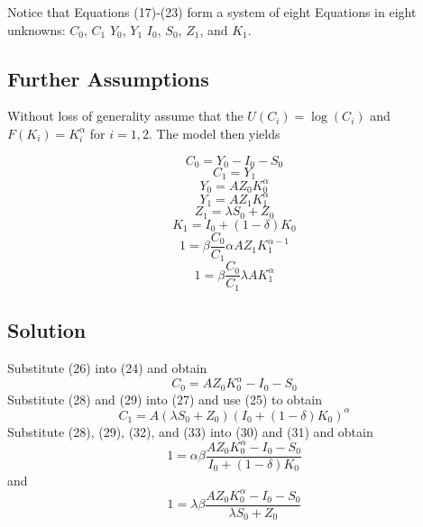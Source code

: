 \documentclass{article}
\begin{document}
	
	Notice that Equations (17)-(23) form a system of eight Equations in eight unknowns: $C_0$, $C_1$ $Y_0$, $Y_1$ $I_0$, $S_0$, $Z_{1}$, and $K_{1}$.
	
	\subsection*{Further Assumptions}
	
	Without loss of generality assume that the $U(C_i) = \log(C_i)$ and $F(K_i) = K_i^{\alpha}$ for $i = 1,2$. The model then yields
	
	\begin{equation}
	C_0 = Y_0 - I_0 - S_0
	\end{equation}
	\begin{equation}
	C_1 = Y_1
	\end{equation}
	\begin{equation}
	Y_0 = A Z_0 K_0^{\alpha}
	\end{equation}
	\begin{equation}
	Y_1 = A Z_1 K_1^{\alpha}
	\end{equation}
	\begin{equation}
	Z_{1} = \lambda S_0 + Z_0
	\end{equation}
	\begin{equation}
	K_{1} = I_0 + (1 - \delta)K_0
	\end{equation}
	\begin{equation}
	1 =  \beta \frac{C_{0}}{C_1}  \alpha A Z_{1} K_{1}^{\alpha - 1}
	\end{equation}
	\begin{equation}
	1 =  \beta  \frac{C_{0}}{C_1} \lambda  A K_{1}^{\alpha} 
	\end{equation}
	
	\subsection*{Solution}
	
	Substitute (26) into (24) and obtain
	\begin{equation}
	C_0 = A Z_0 K_0^{\alpha} - I_0 - S_0
	\end{equation}
	Substitute (28) and (29) into (27) and use (25) to obtain
	\begin{equation}
	C_1 = A (\lambda S_0 + Z_0) (I_0 + (1 - \delta)K_0)^{\alpha}
	\end{equation}
	Substitute (28), (29), (32), and (33) into (30) and (31) and obtain
	\begin{equation}
	1 = \alpha \beta \frac{A Z_0 K_0^{\alpha} - I_0 - S_0}{I_0 + (1 - \delta)K_0}
	\end{equation}
	and
	\begin{equation}
	1 = \lambda \beta \frac{A Z_0 K_0^{\alpha} - I_0 - S_0}{\lambda S_0 + Z_0}
	\end{equation}
	
\end{document}
